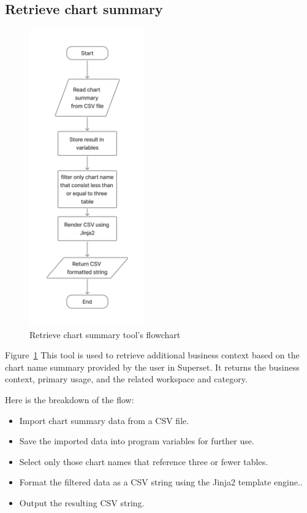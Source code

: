     \subsection{Retrieve chart summary}
    \label{sec:chart_summary}
    \begin{figure}[H]
        \centering
        \includegraphics[width=5cm]{chapters/3/figures/chart_summary.jpg}
        \caption[Retrieve chart summary tool’s flowchart]{Retrieve chart summary tool’s flowchart}
        \label{fig:chart_summary}
    \end{figure}
    Figure~\ref{fig:chart_summary} This tool is used to retrieve additional business context based on the chart name summary provided by the user in Superset. It returns the business context, primary usage, and the related workspace and category.

    Here is the breakdown of the flow:
    \begin{itemize}
        \item  Import chart summary data from a CSV file.
        \item  Save the imported data into program variables for further use.
        \item  Select only those chart names that reference three or fewer tables.
        \item  Format the filtered data as a CSV string using the Jinja2 template engine..
        \item  Output the resulting CSV string.
    \end{itemize}

